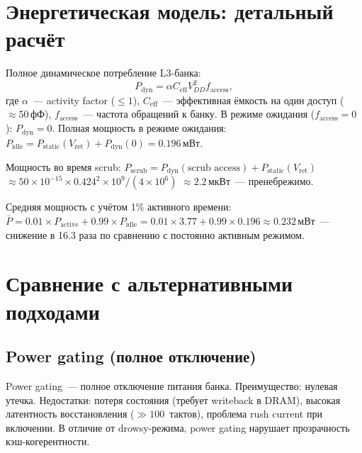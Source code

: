 \section{Энергетическая модель: детальный расчёт}
\label{sec:glava89-energy-model}

Полное динамическое потребление L3-банка:
%
\begin{equation}
  P_\mathrm{dyn} = \alpha C_\mathrm{eff} V_{DD}^2 f_\mathrm{access},
  \label{eq:dyn-power}
\end{equation}
%
где $\alpha$~--- activity factor ($\leq 1$),
$C_\mathrm{eff}$~--- эффективная ёмкость на один доступ ($\approx 50\,\text{фФ}$),
$f_\mathrm{access}$~--- частота обращений к банку.
В режиме ожидания ($f_\mathrm{access} = 0$): $P_\mathrm{dyn} = 0$.
Полная мощность в режиме ожидания:
$P_\mathrm{idle} = P_\mathrm{static}(V_\mathrm{ret}) + P_\mathrm{dyn}(0)
= 0.196\,\text{мВт}$.

Мощность во время scrub:
$P_\mathrm{scrub} = P_\mathrm{dyn}(\text{scrub access}) + P_\mathrm{static}(V_\mathrm{ret})$
$\approx 50 \times 10^{-15} \times 0.424^2 \times 10^9 / (4 \times 10^6)$
$\approx 2.2\,\text{мкВт}$~--- пренебрежимо.

Средняя мощность с учётом 1\% активного времени:
$\bar{P} = 0.01 \times P_\mathrm{active} + 0.99 \times P_\mathrm{idle}
= 0.01 \times 3.77 + 0.99 \times 0.196
\approx 0.232\,\text{мВт}$~--- снижение в 16.3 раза по сравнению с постоянно активным режимом.

\section{Сравнение с альтернативными подходами}
\label{sec:glava89-alternatives}

\subsection{Power gating (полное отключение)}

Power gating~--- полное отключение питания банка.
Преимущество: нулевая утечка.
Недостатки: потеря состояния (требует writeback в DRAM),
высокая латентность восстановления ($\gg 100$~тактов),
проблема rush current при включении.
В отличие от drowsy-режима, power gating нарушает
прозрачность кэш-когерентности.

